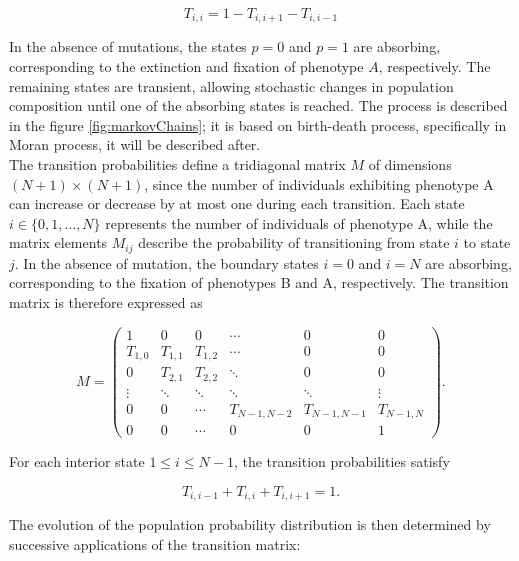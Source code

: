 \begin{equation}
    T_{i,i}=  1-T_{i,i+1} - T_{i,i-1}
    \label{eq:sintransicion}
\end{equation}

In the absence of mutations, the states \(p=0\) and \(p=1\) are absorbing, corresponding to the extinction and fixation of phenotype \(A\), respectively. The remaining states are transient, allowing stochastic changes in population composition until one of the absorbing states is reached. The process is described in the figure \ref{fig:markovChains}; it is based on birth-death process, specifically in Moran process, it will be described after.\\  

The transition probabilities define a tridiagonal matrix \(M\) of dimensions \((N+1)\times(N+1)\), since the number of individuals exhibiting phenotype A can increase or decrease by at most one during each transition. Each state \(i\in\{0,1,\ldots,N\}\) represents the number of individuals of phenotype A, while the matrix elements \(M_{ij}\) describe the probability of transitioning from state \(i\) to state \(j\). In the absence of mutation, the boundary states \(i=0\) and \(i=N\) are absorbing, corresponding to the fixation of phenotypes B and A, respectively. The transition matrix is therefore expressed as

\begin{equation}
M=
\begin{pmatrix}
1 & 0 & 0 & \cdots & 0 & 0 \\
T_{1,0} & T_{1,1} & T_{1,2} & \cdots & 0 & 0 \\
0 & T_{2,1} & T_{2,2} & \ddots & 0 & 0 \\
\vdots & \ddots & \ddots & \ddots & \ddots & \vdots \\
0 & 0 & \cdots & T_{N-1,N-2} & T_{N-1,N-1} & T_{N-1,N} \\
0 & 0 & \cdots & 0 & 0 & 1
\end{pmatrix}.
\label{eq:moran_transition_matrix}
\end{equation}

For each interior state \(1\leq i\leq N-1\), the transition probabilities satisfy

\begin{equation}
T_{i,i-1}+T_{i,i}+T_{i,i+1}=1.
\end{equation}

The evolution of the population probability distribution is then determined by successive applications of the transition matrix:

